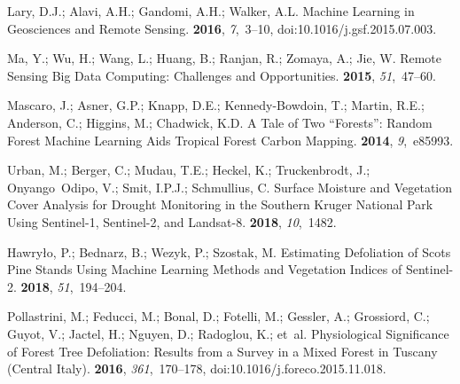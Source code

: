 \documentclass[remotesensing,article,accept,moreauthors,pdftex]{Definitions/mdpi}
\begin{document}
%
\begin{thebibliography}{999}

Lary, D.J.; Alavi, A.H.; Gandomi, A.H.; Walker, A.L.
\newblock Machine Learning in Geosciences and Remote Sensing.
 {\bf 2016}, {\em 7},~3--10, doi:10.1016/j.gsf.2015.07.003.

Ma, Y.; Wu, H.; Wang, L.; Huang, B.; Ranjan, R.; Zomaya, A.; Jie, W.
\newblock Remote Sensing Big Data Computing: Challenges and Opportunities.
 {\bf 2015}, {\em
  51},~47--60.

Mascaro, J.; Asner, G.P.; Knapp, D.E.; {Kennedy-Bowdoin}, T.; Martin, R.E.;
  Anderson, C.; Higgins, M.; Chadwick, K.D.
\newblock A {{Tale}} of {{Two}} ``{{Forests}}'': Random {{Forest Machine
  Learning Aids Tropical Forest Carbon Mapping}}.
 {\bf 2014}, {\em 9},~e85993.

Urban, M.; Berger, C.; Mudau, T.E.; Heckel, K.; Truckenbrodt, J.;
  Onyango~Odipo, V.; Smit, I.P.J.; Schmullius, C.
\newblock Surface {{Moisture}} and {{Vegetation Cover Analysis}} for {{Drought
  Monitoring}} in the {{Southern Kruger National Park Using Sentinel}}-1,
  {{Sentinel}}-2, and {{Landsat}}-8.
 {\bf 2018}, {\em 10},~1482.

Hawry{\l}o, P.; Bednarz, B.; Wezyk, P.; Szostak, M.
\newblock Estimating Defoliation of {{Scots}} Pine Stands Using Machine
  Learning Methods and Vegetation Indices of {{Sentinel}}-2.
 {\bf 2018}, {\em
  51},~194--204.

Pollastrini, M.; Feducci, M.; Bonal, D.; Fotelli, M.; Gessler, A.; Grossiord,
  C.; Guyot, V.; Jactel, H.; Nguyen, D.; Radoglou, K.; et~al.
\newblock Physiological Significance of Forest Tree Defoliation: Results from a
  Survey in a Mixed Forest in {{Tuscany}} (Central {{Italy}}).
 {\bf 2016}, {\em 361},~170--178, doi:10.1016/j.foreco.2015.11.018.


\end{thebibliography}
\end{document}
